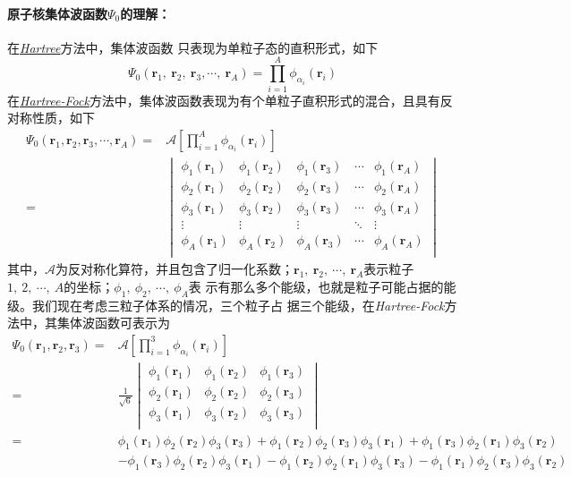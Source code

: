 \paragraph*{原子核集体波函数$\Psi_0$的理解：}在\uline{\textsl{Hartree}}方法中，集体波函数
只表现为单粒子态的直积形式，如下
\begin{equation}
	\Psi_0(\bm{r}_1,\ \bm{r}_2,\ \bm{r}_3,\cdots,\ \bm{r}_A) = \prod_{i=1}^{A} 
    \phi_{\alpha_i}(\bm{r}_i)
\end{equation} 
在\uline{\textsl{Hartree-Fock}}方法中，集体波函数表现为有个单粒子直积形式的混合，且具有反
对称性质，如下
\begin{equation}
    \begin{aligned}
		\Psi_0(\bm{r}_1, \bm{r}_2, \bm{r}_3, \cdots, \bm{r}_A) ={}& \mathcal{A}\left[ 
        \prod_{i=1}^{A} \phi_{\alpha_i}(\bm{r}_i) \right]	\\
		={}& 
		\begin{vmatrix}
			\phi_1(\bm{r}_1)	&	\phi_1(\bm{r}_2)	&	\phi_1(\bm{r}_3)	&	\cdots	&	\phi_1(\bm{r}_A)	\\
			\phi_2(\bm{r}_1)	&	\phi_2(\bm{r}_2)	&	\phi_2(\bm{r}_3)	&	\cdots	&	\phi_2(\bm{r}_A)	\\
			\phi_3(\bm{r}_1)	&	\phi_3(\bm{r}_2)	&	\phi_3(\bm{r}_3)	&	\cdots	&	\phi_3(\bm{r}_A)	\\
			\vdots				&	\vdots				&	\vdots				&	\ddots	&	\vdots				\\
			\phi_A(\bm{r}_1)	&	\phi_A(\bm{r}_2)	&	\phi_A(\bm{r}_3)	&	\cdots	&	\phi_A(\bm{r}_A)	\\
		\end{vmatrix}
    \end{aligned}
\end{equation} 
	其中，$\mathcal{A}$为反对称化算符，并且包含了归一化系数；$\bm{r}_1,\ \bm{r}_2,\ \cdots,
    \ \bm{r}_A$表示粒子$1,\ 2,\ \cdots,\ A$的坐标；$\phi_1,\ \phi_2,\ \cdots,\ \phi_A$表
    示有那么多个能级，也就是粒子可能占据的能级。我们现在考虑三粒子体系的情况，三个粒子占
    据三个能级，在\textsl{Hartree-Fock}方法中，其集体波函数可表示为
\begin{equation}
    \begin{aligned}
		\Psi_0(\bm{r}_1, \bm{r}_2, \bm{r}_3) ={}& \mathcal{A}\left[ \prod_{i=1}^{3} 
        \phi_{\alpha_i}(\bm{r}_i) \right]	\\
		={}& \frac{1}{\sqrt{6}} 
		\begin{vmatrix}
			\phi_1(\bm{r}_1)	&	\phi_1(\bm{r}_2)	&	\phi_1(\bm{r}_3)	\\
			\phi_2(\bm{r}_1)	&	\phi_2(\bm{r}_2)	&	\phi_2(\bm{r}_3)	\\
			\phi_3(\bm{r}_1)	&	\phi_3(\bm{r}_2)	&	\phi_3(\bm{r}_3)	\\
		\end{vmatrix}	\\
		={}& \phi_1(\bm{r}_1)\phi_2(\bm{r}_2)\phi_3(\bm{r}_3) + \phi_1(\bm{r}_2)\phi_2(\bm{r}_3)\phi_3(\bm{r}_1) + \phi_1(\bm{r}_3)\phi_2(\bm{r}_1)\phi_3(\bm{r}_2) \\
		&- \phi_1(\bm{r}_3)\phi_2(\bm{r}_2)\phi_3(\bm{r}_1) - \phi_1(\bm{r}_2)\phi_2(\bm{r}_1)\phi_3(\bm{r}_3) - \phi_1(\bm{r}_1)\phi_2(\bm{r}_3)\phi_3(\bm{r}_2) 
    \end{aligned}
\end{equation} 
